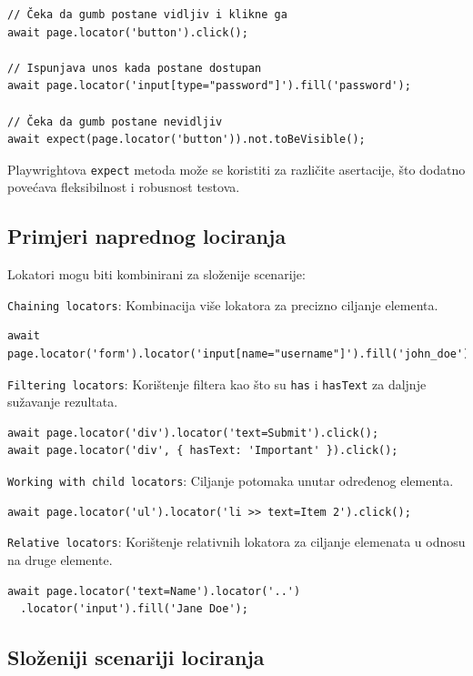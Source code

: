 \begin{verbatim}
// Čeka da gumb postane vidljiv i klikne ga
await page.locator('button').click();

// Ispunjava unos kada postane dostupan
await page.locator('input[type="password"]').fill('password');

// Čeka da gumb postane nevidljiv
await expect(page.locator('button')).not.toBeVisible();
\end{verbatim}

Playwrightova \texttt{expect} metoda može se koristiti za različite asertacije, što dodatno povećava fleksibilnost i robusnost testova.

\subsection*{Primjeri naprednog lociranja}

Lokatori mogu biti kombinirani za složenije scenarije:

\texttt{Chaining locators}: Kombinacija više lokatora za precizno ciljanje elementa.

\begin{verbatim}
await page.locator('form').locator('input[name="username"]').fill('john_doe');
\end{verbatim}

\texttt{Filtering locators}: Korištenje filtera kao što su \texttt{has} i \texttt{hasText} za daljnje sužavanje rezultata.

\begin{verbatim}
await page.locator('div').locator('text=Submit').click();
await page.locator('div', { hasText: 'Important' }).click();
\end{verbatim}

\texttt{Working with child locators}: Ciljanje potomaka unutar određenog elementa.

\begin{verbatim}
await page.locator('ul').locator('li >> text=Item 2').click();
\end{verbatim}

\texttt{Relative locators}: Korištenje relativnih lokatora za ciljanje elemenata u odnosu na druge elemente.

\begin{verbatim}
await page.locator('text=Name').locator('..')
  .locator('input').fill('Jane Doe');
\end{verbatim}

\subsection*{Složeniji scenariji lociranja}

